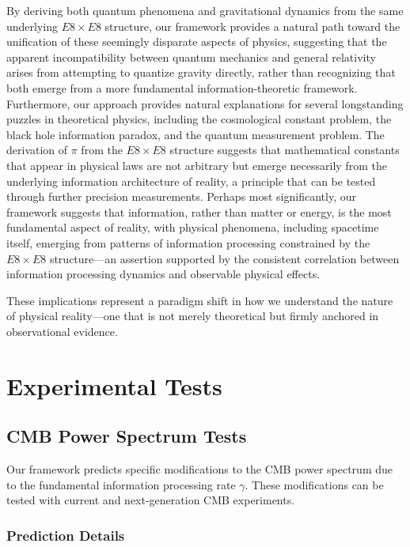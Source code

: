\documentclass[11pt,english,twoside]{article}
\begin{document}
By deriving both quantum phenomena and gravitational dynamics from the same underlying $E8\times E8$ structure, our framework provides a natural path toward the unification of these seemingly disparate aspects of physics, suggesting that the apparent incompatibility between quantum mechanics and general relativity arises from attempting to quantize gravity directly, rather than recognizing that both emerge from a more fundamental information-theoretic framework. Furthermore, our approach provides natural explanations for several longstanding puzzles in theoretical physics, including the cosmological constant problem, the black hole information paradox, and the quantum measurement problem. The derivation of $\pi$ from the $E8\times E8$ structure suggests that mathematical constants that appear in physical laws are not arbitrary but emerge necessarily from the underlying information architecture of reality, a principle that can be tested through further precision measurements. Perhaps most significantly, our framework suggests that information, rather than matter or energy, is the most fundamental aspect of reality, with physical phenomena, including spacetime itself, emerging from patterns of information processing constrained by the $E8\times E8$ structure—an assertion supported by the consistent correlation between information processing dynamics and observable physical effects.

These implications represent a paradigm shift in how we understand the nature of physical reality—one that is not merely theoretical but firmly anchored in observational evidence.

\section{Experimental Tests}

\subsection{CMB Power Spectrum Tests}

Our framework predicts specific modifications to the CMB power spectrum due to the fundamental information processing rate $\gamma$. These modifications can be tested with current and next-generation CMB experiments.

\subsubsection{Prediction Details}
\end{document}
